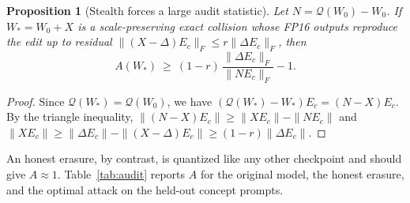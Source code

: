 \documentclass[conference]{IEEEtran}
\newtheorem{proposition}{Proposition}
\begin{document}
\begin{proposition}[Stealth forces a large audit statistic]
\label{prop:audit}
Let $N=\mathcal{Q}(W_0)-W_0$. If $W_*=W_0+X$ is a scale-preserving exact collision
whose FP16 outputs reproduce the edit up to residual
$\|(X-\Delta)E_c\|_F\le r\|\Delta E_c\|_F$, then
\begin{equation}
 A(W_*)\ \ge\ (1-r)\,\frac{\|\Delta E_c\|_F}{\|NE_c\|_F}-1.
\end{equation}
\end{proposition}
\begin{proof}
Since $\mathcal{Q}(W_*)=\mathcal{Q}(W_0)$, we have $(\mathcal{Q}(W_*)-W_*)E_c=(N-X)E_c$.
By the triangle inequality, $\|(N-X)E_c\|\ge\|XE_c\|-\|NE_c\|$ and
$\|XE_c\|\ge\|\Delta E_c\|-\|(X-\Delta)E_c\|\ge(1-r)\|\Delta E_c\|$.
\end{proof}

An honest erasure, by contrast, is quantized like any other checkpoint and should give
$A\approx1$. Table~\ref{tab:audit} reports $A$ for the original model, the honest
erasure, and the optimal attack on the held-out concept prompts.

\begin{table}[t]
\centering
\caption{Image-free audit statistic $A$ (Eq.~\ref{eq:audit}) on held-out concept
prompts. The denominator uses the public base model. The last column is the
lower bound of Proposition~\ref{prop:audit} at the attack's measured residual.}
\label{tab:audit}
\end{table}
\end{document}
